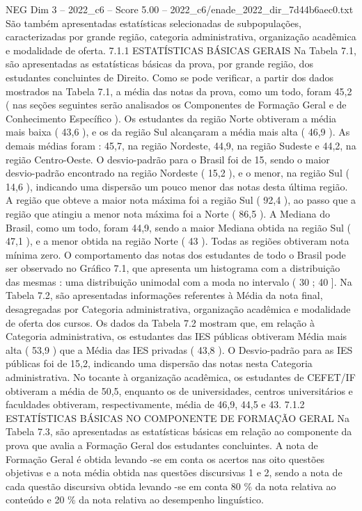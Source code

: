 \begin{textsample}{NEG Dim 3 – 2022\_c6 – Score 5.00 – 2022\_c6/enade\_2022\_dir\_7d44b6aec0.txt}
São também apresentadas estatísticas selecionadas de subpopulações, caracterizadas por grande região, categoria administrativa, organização acadêmica e modalidade de oferta. 7.1.1 ESTATÍSTICAS BÁSICAS GERAIS Na Tabela 7.1, são apresentadas as estatísticas básicas da prova, por grande região, dos estudantes concluintes de Direito.
Como se pode verificar, a partir dos dados mostrados na Tabela 7.1, a média das notas da prova, como um todo, foram 45,2 ( nas seções seguintes serão analisados os Componentes de Formação Geral e de Conhecimento Específico ).
Os estudantes da região Norte obtiveram a média mais baixa ( 43,6 ), e os da região Sul alcançaram a média mais alta ( 46,9 ).
As demais médias foram : 45,7, na região Nordeste, 44,9, na região Sudeste e 44,2, na região Centro-Oeste.
O desvio-padrão para o Brasil foi de 15, sendo o maior desvio-padrão encontrado na região Nordeste ( 15,2 ), e o menor, na região Sul ( 14,6 ), indicando uma dispersão um pouco menor das notas desta última região.
A região que obteve a maior nota máxima foi a região Sul ( 92,4 ), ao passo que a região que atingiu a menor nota máxima foi a Norte ( 86,5 ).
A Mediana do Brasil, como um todo, foram 44,9, sendo a maior Mediana obtida na região Sul ( 47,1 ), e a menor obtida na região Norte ( 43 ).
Todas as regiões obtiveram nota mínima zero.
O comportamento das notas dos estudantes de todo o Brasil pode ser observado no Gráfico 7.1, que apresenta um histograma com a distribuição das mesmas : uma distribuição unimodal com a moda no intervalo ( 30 ; 40 ].
Na Tabela 7.2, são apresentadas informações referentes à Média da nota final, desagregadas por Categoria administrativa, organização acadêmica e modalidade de oferta dos cursos.
Os dados da Tabela 7.2 mostram que, em relação à Categoria administrativa, os estudantes das IES públicas obtiveram Média mais alta ( 53,9 ) que a Média das IES privadas ( 43,8 ).
O Desvio-padrão para as IES públicas foi de 15,2, indicando uma dispersão das notas nesta Categoria administrativa.
No tocante à organização acadêmica, os estudantes de CEFET/IF obtiveram a média de 50,5, enquanto os de universidades, centros universitários e faculdades obtiveram, respectivamente, média de 46,9, 44,5 e 43. 7.1.2 ESTATÍSTICAS BÁSICAS NO COMPONENTE DE FORMAÇÃO GERAL Na Tabela 7.3, são apresentadas as estatísticas básicas em relação ao componente da prova que avalia a Formação Geral dos estudantes concluintes.
A nota de Formação Geral é obtida levando -se em conta os acertos nas oito questões objetivas e a nota média obtida nas questões discursivas 1 e 2, sendo a nota de cada questão discursiva obtida levando -se em conta 80 \% da nota relativa ao conteúdo e 20 \% da nota relativa ao desempenho linguístico.

\end{textsample}
